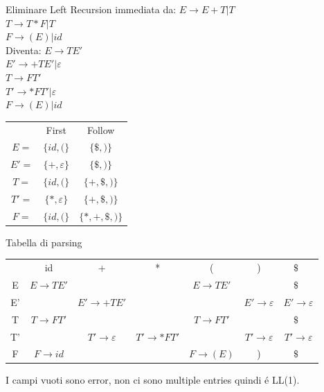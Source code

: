 Eliminare Left Recursion immediata da:
$E \rightarrow E + T | T $\\
$T \rightarrow T*F|T  $\\
$F \rightarrow (E)|id $\\

Diventa:
$E \rightarrow TE' $\\
$E' \rightarrow +TE'|\varepsilon $\\
$T \rightarrow FT'  $\\
$T' \rightarrow *FT' | \varepsilon $\\
$F \rightarrow (E)|id $\\

\begin{tabular}{ccc}
              &   First                    &   Follow                   \\    
    $E=$      &    $\{ id, ( \}$           &   $\{ \$, ) \}$            \\
    $E'=$     &    $\{ +, \varepsilon \}$     &   $\{ \$, ) \}$            \\
    $T=$      &    $\{ id, ( \}$           &   $\{ +, \$, ) \}$         \\
    $T'=$     &    $\{ *, \varepsilon \}$     &   $\{ +, \$, ) \}$         \\
    $F=$      &    $\{ id, ( \}$           &   $\{ *, +, \$, ) \}$      \\
\end{tabular}

Tabella di parsing

\begin{tabular}{|c|c|c|c|c|c|c|}
        &   id      &    +   &   *   &   (   &   )   &   $\$$\   \\
    E   &   $E \rightarrow TE' $    &  & &   $E \rightarrow TE' $   &      &   $\$$\   \\
    E'  &   &    $E' \rightarrow +TE' $ &      &      &   $E' \rightarrow \varepsilon $   &  $E' \rightarrow \varepsilon $   \\
    T   &   $T \rightarrow FT' $    &  & &   $T \rightarrow FT' $   & &   $\$$\   \\
    T'  &   & $T' \rightarrow \varepsilon $ & $T' \rightarrow *FT' $   & &   $T' \rightarrow \varepsilon $   &   $T' \rightarrow \varepsilon $ \\
    F   &   $F \rightarrow id $ &  &  &   $F \rightarrow (E) $   &   )   &   $\$$\   \\
\end{tabular}
I campi vuoti sono error, non ci sono multiple entries quindi \'e LL(1).

